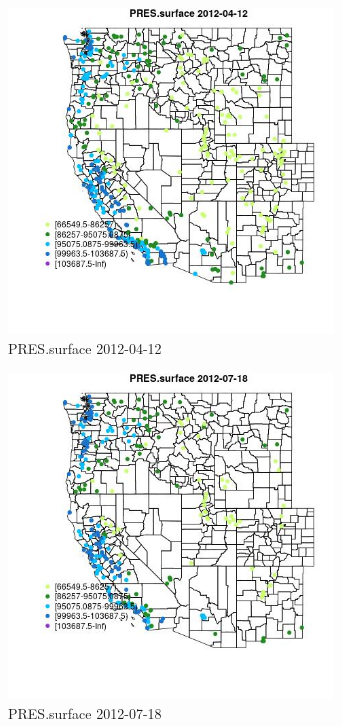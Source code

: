 \begin{figure} 
\centering  
\includegraphics[width=0.77\textwidth]{Code_Outputs/Report_ML_input_PM25_Step4_part_e_de_duplicated_aves_compiled_2019-05-14wNAs_MapObsPRESsurface2012-04-12.jpg} 
\caption{\label{fig:Report_ML_input_PM25_Step4_part_e_de_duplicated_aves_compiled_2019-05-14wNAsMapObsPRESsurface2012-04-12}PRES.surface 2012-04-12} 
\end{figure} 
 

\begin{figure} 
\centering  
\includegraphics[width=0.77\textwidth]{Code_Outputs/Report_ML_input_PM25_Step4_part_e_de_duplicated_aves_compiled_2019-05-14wNAs_MapObsPRESsurface2012-07-18.jpg} 
\caption{\label{fig:Report_ML_input_PM25_Step4_part_e_de_duplicated_aves_compiled_2019-05-14wNAsMapObsPRESsurface2012-07-18}PRES.surface 2012-07-18} 
\end{figure} 
 

